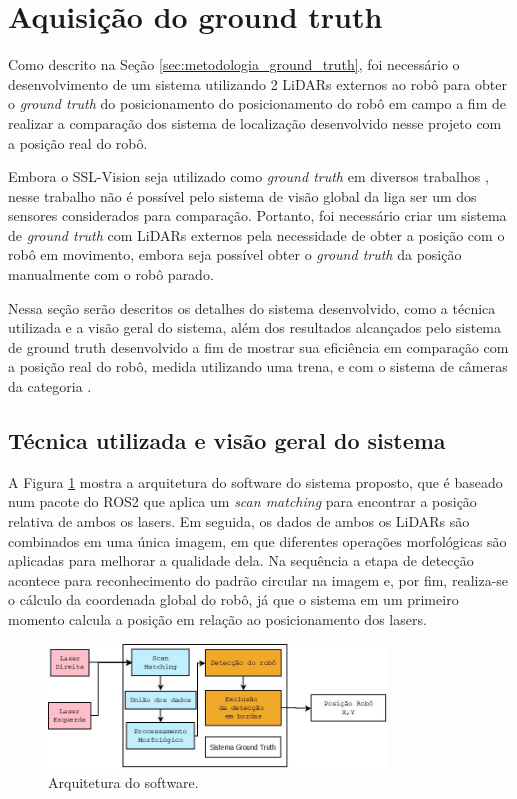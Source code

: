 \documentclass[acronym, symbols, table]{fei}
\begin{document}
		\section{Aquisição do ground truth} \label{sec:resultados_ground_truth}
		
			Como descrito na Seção \ref{sec:metodologia_ground_truth}, foi necessário o desenvolvimento de um sistema utilizando 2 LiDARs externos ao robô para obter o \textit{ground truth} do posicionamento do posicionamento do robô em campo a fim de realizar a comparação dos sistema de localização desenvolvido nesse projeto com a posição real do robô. 
			
			Embora o SSL-Vision seja utilizado como \textit{ground truth} em diversos trabalhos \cite{9018557, melo2022embedded}, nesse trabalho não é possível pelo sistema de visão global da liga ser um dos sensores considerados para comparação. Portanto, foi necessário criar um sistema de \textit{ground truth} com LiDARs externos pela necessidade de obter a posição com o robô em movimento, embora seja possível obter o \textit{ground truth} da posição manualmente com o robô parado.
			
			Nessa seção serão descritos os detalhes do sistema desenvolvido, como a técnica utilizada e a visão geral do sistema, além dos resultados alcançados pelo sistema de ground truth desenvolvido a fim de mostrar sua eficiência em comparação com a posição real do robô, medida utilizando uma trena, e com o sistema de câmeras da categoria .
		
			\subsection{Técnica utilizada e visão geral do sistema}
				
				A Figura \ref{fig:software_architecture} mostra a arquitetura do software do sistema proposto, que é baseado num pacote do ROS2 que aplica um \textit{scan matching} para encontrar a posição relativa de ambos os lasers. Em seguida, os dados de ambos os LiDARs são combinados em uma única imagem, em que diferentes operações morfológicas são aplicadas para melhorar a qualidade dela. Na sequência a etapa de detecção acontece para reconhecimento do padrão circular na imagem e, por fim, realiza-se o cálculo da coordenada global do robô, já que o sistema em um primeiro momento calcula a posição em relação ao posicionamento dos lasers.
					
				\begin{figure}[!htb]
					\centering
					\includegraphics[width=0.80\textwidth]{software_architecture.jpeg}
					\caption{Arquitetura do software.} \label{fig:software_architecture}
				\end{figure}
			
\end{document}
